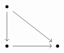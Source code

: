 \[\begin{tikzcd}
	\bullet \\
	\\
	\bullet && \bullet
	\arrow[from=1-1, to=3-1]
	\arrow[from=3-1, to=3-3]
	\arrow[from=1-1, to=3-3]
\end{tikzcd}\]